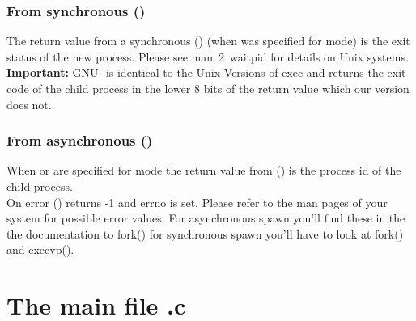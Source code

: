 \documentclass[11pt,a4paper]{article}%
\begin{document}
\subsubsection {From synchronous {\Tt{}()}}

The return value from a synchronous {\Tt{}()}
(when {\Tt{}} was specified for mode) is the exit 
status of the new process. Please see {\Tt{}man\ 2\ waitpid}
for details on Unix systems.\\[2ex]
\textbf{Important:} GNU-{\Tt{}} is identical to
the Unix-Versions of {\Tt{}exec} and returns the exit code of the child 
process in the lower 8 bits of the return value which
our version does not.

\subsubsection {From asynchronous {\Tt{}()}}
When {\Tt{}} or {\Tt{}} are specified for {\Tt{}mode}
the return value from {\Tt{}()} is the process id
of the child process.\\[2ex]
On error {\Tt{}()} returns -1 and {\Tt{}errno} is set. Please
refer to the man pages of your system for possible error
values. For asynchronous {\Tt{}spawn} you'll find these in the
the documentation to {\Tt{}fork()} for synchronous {\Tt{}spawn} you'll
have to look at {\Tt{}fork()} and {\Tt{}execvp()}.

\section {The main file {\Tt{}.c}}
\end{document}
